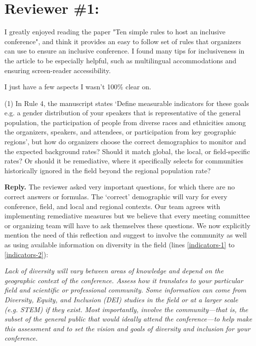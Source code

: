 \documentclass{article}
\newenvironment{Reply}{\noindent\color{BlueViolet}\textbf{Reply.}}{\vspace{1em}}
\begin{document}
\section*{Reviewer \#1:}
I greatly enjoyed reading the paper "Ten simple rules to host an inclusive conference", and think it provides an easy to follow set of rules that organizers can use to ensure an inclusive conference. I found many tips for inclusiveness in the article to be especially helpful, such as multilingual accommodations and ensuring screen-reader accessibility.

I just have a few aspects I wasn't 100\% clear on.

(1) In Rule 4, the manuscript states `Define measurable indicators for these goals e.g. a gender distribution of your speakers that is representative of the general population, the participation of people from diverse races and ethnicities among the organizers, speakers, and attendees, or participation from key geographic regions', but how do organizers choose the correct demographics to monitor and the expected background rates? Should it match global, the local, or field-specific rates? Or should it be remediative, where it specifically selects for communities historically ignored in the field beyond the regional population rate?

\begin{Reply}
   The reviewer asked very important questions, for which there are no correct answers or formulas. 
   The `correct' demographic will vary for every conference, field, and local and regional contexts. 
   Our team agrees with implementing remediative measures but we believe that every meeting committee or organizing team will have to ask themselves these questions.
   We now explicitly mention the need of this reflection and suggest to involve the community as well as using available information on diversity in the field (lines \ref{indicators-1} to \ref{indicators-2}):
   
   \textit{
    Lack of diversity will vary between areas of knowledge and depend on the geographic context of the conference.
    Assess how it translates to your particular field and scientific or professional community.
    Some information can come from Diversity, Equity, and Inclusion (DEI) studies in the field or at a larger scale (e.g. STEM) if they exist.
    Most importantly, involve the community---that is, the subset of the general public that would ideally attend the conference---to help make this assessment and to set the vision and goals of diversity and inclusion for your conference.
   }
   
\end{Reply}
\end{document}
